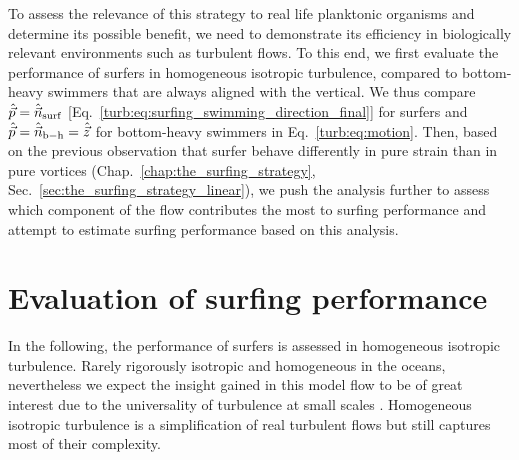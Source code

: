 To assess the relevance of this strategy to real life planktonic organisms and determine its possible benefit, we need to demonstrate its efficiency in biologically relevant environments such as turbulent flows.
To this end, we first evaluate the performance of surfers in homogeneous isotropic turbulence, compared to bottom-heavy swimmers that are always aligned with the vertical.
We thus compare $\hat{\vec{p}} = \hat{\vec{n}}_{\mathrm{surf}}$ [Eq.~\eqref{turb:eq:surfing_swimming_direction_final}] for surfers and $\hat{\vec{p}}=\hat{\vec{n}}_{\mathrm{b-h}}=\hat{\vec{z}}$ for bottom-heavy swimmers in Eq.~\eqref{turb:eq:motion}.
Then, based on the previous observation that surfer behave differently in pure strain than in pure vortices (Chap.~\ref{chap:the_surfing_strategy}, Sec.~\ref{sec:the_surfing_strategy_linear}), we push the analysis further to assess which component of the flow contributes the most to surfing performance and attempt to estimate surfing performance based on this analysis.

\section{Evaluation of surfing performance}\label{sec:surfing_on_turbulence_IHT}

In the following, the performance of surfers is assessed in homogeneous isotropic turbulence.
Rarely rigorously isotropic and homogeneous in the oceans, nevertheless we expect the insight gained in this model flow to be of great interest due to the universality of turbulence at small scales \citep{frisch1995turbulence}.
Homogeneous isotropic turbulence is a simplification of real turbulent flows but still captures most of their complexity.


